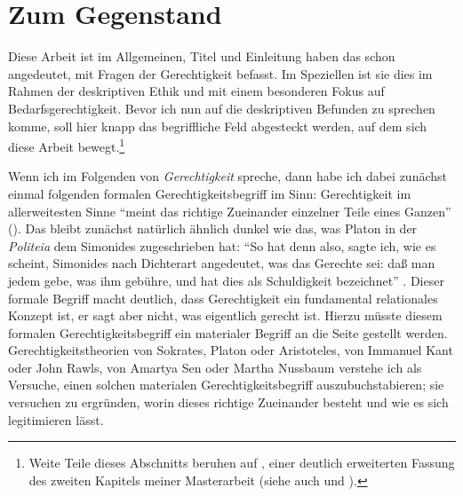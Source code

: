 \documentclass[justified,nobib,nohyper,symmetric,twoside]{tufte-book}
\begin{document}
\chapter{Zum Gegenstand}\label{ch:gegenstand}
Diese Arbeit ist im Allgemeinen, Titel und Einleitung haben das schon angedeutet, mit Fragen der Gerechtigkeit befasst.
Im Speziellen ist sie dies im Rahmen der deskriptiven Ethik und mit einem besonderen Fokus auf Bedarfsgerechtigkeit.
Bevor ich nun auf die deskriptiven Befunden zu sprechen komme, soll hier knapp das begriffliche Feld abgesteckt werden, auf dem sich diese Arbeit bewegt.\footnote{Weite Teile dieses Abschnitts beruhen auf \citet{bauer_gerechtigkeit_2019}, einer deutlich erweiterten Fassung des zweiten Kapitels meiner Masterarbeit (siehe auch \cite{bauer_monotonie_2018} und \cite{bauer_grundlegung_2019}).}

Wenn ich im Folgenden von \textit{Gerechtigkeit} spreche, dann habe ich dabei zunächst einmal folgenden formalen Gerechtigkeitsbegriff im Sinn: Gerechtigkeit im allerweitesten Sinne \enquote{meint das richtige Zueinander einzelner Teile eines Ganzen} (\cite[S.~289]{bauer_gerechtigkeit_2019}).
Das bleibt zunächst natürlich ähnlich dunkel wie das, was Platon in der \textit{Politeia} dem Simonides zugeschrieben hat: \enquote{So hat denn also, sagte ich, wie es scheint, Simonides nach Dichterart angedeutet, was das Gerechte sei: daß man jedem gebe, was ihm gebühre, und hat dies als Schuldigkeit bezeichnet} \citep[S.~13, 332\,b--c]{platon_staat_2004}.
Dieser formale Begriff macht deutlich, dass Gerechtigkeit ein fundamental relationales Konzept ist, er sagt aber nicht, was eigentlich gerecht ist.
Hierzu müsste diesem formalen Gerechtigkeitsbegriff ein materialer Begriff an die Seite gestellt werden.
Gerechtigkeitstheorien von Sokrates, Platon oder Aristoteles, von Immanuel Kant oder John Rawls, von Amartya Sen oder Martha Nussbaum verstehe ich als Versuche, einen solchen materialen Gerechtigkeitsbegriff auszubuchstabieren; sie versuchen zu ergründen, worin dieses richtige Zueinander besteht und wie es sich legitimieren lässt.
\end{document}
